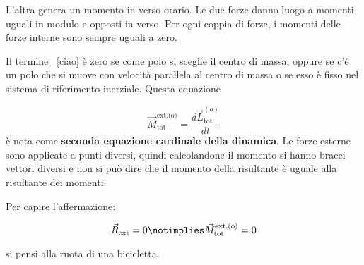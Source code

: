 \begin{figure}[htpb]
\end{figure}
\FloatBarrier
L'altra genera un momento in verso orario. Le due forze danno luogo a momenti uguali in modulo e opposti in verso. Per ogni coppia di forze, i momenti delle forze interne sono sempre uguali a zero.

Il termine ~\eqref{ciao} è zero se come polo si sceglie il centro di massa, oppure se c'è un polo che si muove con velocità parallela al centro di massa o se esso è fisso nel sistema di riferimento inerziale. Questa equazione

\[
	\boxed{\vec{M}_\text{tot}^\text{ext,(o)}=\frac{d\vec{L}_\text{tot}^{(o)}}{dt}}
\]
è nota come \textbf{seconda equazione cardinale della dinamica}. Le forze esterne sono applicate a punti diversi, quindi calcolandone il momento si hanno bracci vettori diversi e non si può dire che il momento della risultante è uguale alla risultante dei momenti.

Per capire l'affermazione:

\[
	\vec{R}_\text{ext}=0 \notimplies \vec{M}_\text{tot}^\text{ext,(o)}=0
\]

si pensi alla ruota di una bicicletta.

